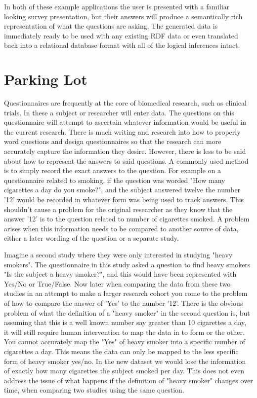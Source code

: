 \documentclass{amia}
\begin{document}
In both of these example applications the user is presented with a familiar looking survey presentation, but their answers will produce a semantically rich representation of what the questions are asking.  The generated data is immediately ready to be used with any existing RDF data or even translated back into a relational database format with all of the logical inferences intact.

\section*{Parking Lot}
Questionnaires are frequently at the core of biomedical research, such as clinical trials. In these a subject or researcher will enter data.
The questions on this questionnaire will attempt to ascertain whatever information would be useful in the current research.
There is much writing and research into how to properly word questions and design questionnaires so that the research can more accurately capture the information they desire.
However, there is less to be said about how to represent the answers to said questions.
A commonly used method is to simply record the exact answers to the question.
For example on a questionnaire related to smoking, if the question was worded "How many cigarettes a day do you smoke?", and the subject answered twelve the number '12' would be recorded in whatever form was being used to track answers.
This shouldn't cause a problem for the original researcher as they know that the answer '12' is to the question related to number of cigarettes smoked.
A problem arises when this information needs to be compared to another source of data, either a later wording of the question or a separate study.


Imagine a second study where they were only interested in studying "heavy smokers".
The questionnaire in this study asked a question to find heavy smokers "Is the subject a heavy smoker?", and this would have been represented with Yes/No or True/False.
Now later when comparing the data from these two studies in an attempt to make a larger research cohort you come to the problem of how to compare the answer of 'Yes' to the number '12'.
There is the obvious problem of what the definition of a "heavy smoker" in the second question is, but assuming that this is a well known number say greater than 10 cigarettes a day, it will still require human intervention to map the data in to form or the other.
You cannot accurately map the "Yes" of heavy smoker into a specific number of cigarettes a day.
This means the data can only be mapped to the less specific form of heavy smoker yes/no.
In the new dataset we would lose the information of exactly how many cigarettes the subject smoked per day.
This does not even address the issue of what happens if the definition of "heavy smoker" changes over time, when comparing two studies using the same question.
\end{document}
